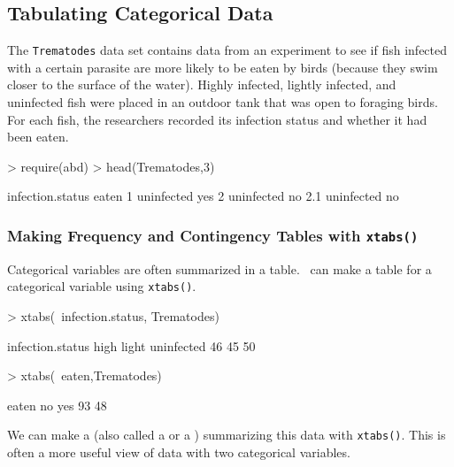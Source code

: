 \subsection{Tabulating Categorical Data}
The \verb!Trematodes! data set contains data from an experiment to see if
fish infected with a certain parasite are more likely to be eaten by birds 
(because they swim closer to the surface of the water).  Highly infected, 
lightly infected, and uninfected fish were placed in an outdoor tank that 
was open to foraging birds.  For each fish, the researchers recorded its
infection status and whether it had been eaten.

\begin{Schunk}
\begin{Sinput}
> require(abd)
> head(Trematodes,3)
\end{Sinput}
\begin{Soutput}
    infection.status eaten
1         uninfected   yes
2         uninfected    no
2.1       uninfected    no
\end{Soutput}
\end{Schunk}

\subsubsection{Making Frequency and Contingency Tables with \texttt{xtabs()}}
Categorical variables are  often summarized in a table.  
\R\ can make a table for a categorical variable using \verb!xtabs()!.

\begin{Schunk}
\begin{Sinput}
> xtabs(~infection.status, Trematodes)
\end{Sinput}
\begin{Soutput}
infection.status
      high      light uninfected 
        46         45         50 
\end{Soutput}
\begin{Sinput}
> xtabs(~eaten,Trematodes)
\end{Sinput}
\begin{Soutput}
eaten
 no yes 
 93  48 
\end{Soutput}
\end{Schunk}

We can make a  
(also called a  or a ) 
summarizing this data with \verb!xtabs()!.  This is often a more useful view of 
data with two categorical variables.

